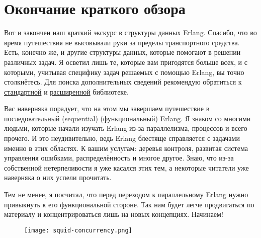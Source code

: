 \section{Окончание краткого обзора}
\label{end-of-the-short-visit}
Вот и закончен наш краткий экскурс в структуры данных Erlang.
Спасибо, что во время путешествия не высовывали руки за пределы транспортного средства.
Есть, конечно же, и другие структуры данных, которые помогают в решении различных задач.
Я осветил лишь те, которые вам пригодятся больше всех, и с которыми, учитывая специфику задач решаемых с помощью  Erlang, вы точно столкнётесь.
Для поиска дополнительных сведений рекомендую обратиться к \href{http://www.erlang.org/doc/apps/stdlib/index.html}{стандартной} и \href{http://www.erlang.org/doc/applications.html}{расширенной} библиотеке.

Вас наверняка порадует, что на этом мы завершаем путешествие в последовательный (sequential) (функциональный) Erlang.
Я знаком со многими людьми, которые начали изучать  Erlang из\--за параллелизма, процессов и всего прочего.
И это неудивительно, ведь Erlang блестяще справляется с задачами именно в этих областях.
К вашим услугам: деревья контроля, развитая система управления ошибками, распределённость и многое другое.
Знаю, что из\--за собственной нетерпеливости я уже касался этих тем, а некоторые читатели уже наверняка о них успели прочитать.

Тем не менее, я посчитал, что перед переходом к параллельному Erlang нужно привыкнуть к его функциональной стороне.
Так нам будет легче продвигаться по материалу и концентрироваться лишь на новых концепциях.
Начинаем!
\begin{figure}[h!]
    \centering
    \texttt{[image: squid-concurrency.png]}
\end{figure}
